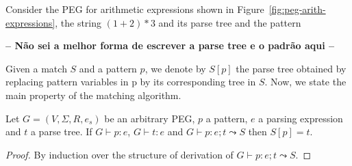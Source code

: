 \begin{example}
  Consider the PEG for arithmetic expressions shown in Figure~\ref{fig:peg-arith-expressions}, 
  the string \((1+2)*3\) and its parse tree and the pattern 
  
  \textbf{-- Não sei a melhor forma de escrever a parse tree e o padrão aqui --}
  

\end{example}

Given a match $S$ and a pattern $p$, we denote by $S[p]$ the parse tree
obtained by replacing pattern variables in p by its corresponding tree
in $S$. Now, we state the main property of the matching algorithm.

\begin{theorem}\label{thm:matching-correct}
  Let $G = (V,\Sigma,R, e_s)$ be an arbitrary PEG, $p$ a pattern,
  $e$ a parsing expression and $t$ a parse tree. If $G \vdash p : e$, $G \vdash t : e$ and
  $G\vdash p : e ; t \leadsto S$ then $S[p] = t$.
\end{theorem}
\begin{proof}
  By induction over the structure of derivation of $G\vdash p : e ; t \leadsto S$.
\end{proof}

